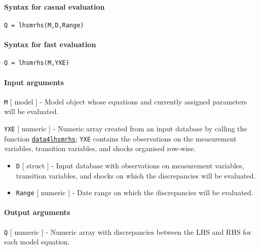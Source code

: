 


	\paragraph{Syntax for casual
evaluation}\label{syntax-for-casual-evaluation}

\begin{verbatim}
Q = lhsmrhs(M,D,Range)
\end{verbatim}

\paragraph{Syntax for fast evaluation}\label{syntax-for-fast-evaluation}

\begin{verbatim}
Q = lhsmrhs(M,YXE)
\end{verbatim}

\paragraph{Input arguments}\label{input-arguments}

\texttt{M} {[} model {]} - Model object whose equations and currently
assigned parameters will be evaluated.

\texttt{YXE} {[} numeric {]} - Numeric array created from an input
database by calling the function
\href{model/data4lhsmrhs}{\texttt{data4lhsmrhs}}; \texttt{YXE} contains
the observations on the measurement variables, transition variables, and
shocks organised row-wise.

\begin{itemize}
\item
  \texttt{D} {[} struct {]} - Input database with observations on
  measurement variables, transition variables, and shocks on which the
  discrepancies will be evaluated.
\item
  \texttt{Range} {[} numeric {]} - Date range on which the discrepancies
  will be evaluated.
\end{itemize}

\paragraph{Output arguments}\label{output-arguments}

\texttt{Q} {[} numeric {]} - Numeric array with discrepancies between
the LHS and RHS for each model equation.

